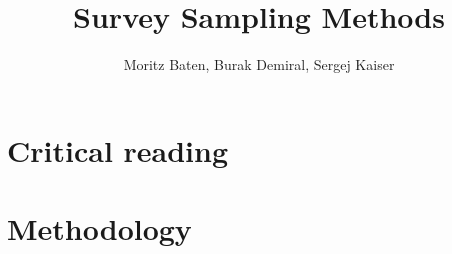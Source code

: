 \usepackage{amssymb}
\usepackage{graphicx}
\usepackage{lmodern}
\usepackage[left=2cm,right=2cm,top=2cm,bottom=2cm]{geometry}
\usepackage{float}
\usepackage{adjustbox}
\usepackage{booktabs}
\usepackage[left=3cm,right=3cm,top=3cm,bottom=3cm]{geometry}
\usepackage{fancyhdr} %
\usepackage{natbib}
 
\title{Survey Sampling Methods}
\author{Moritz Baten, Burak Demiral,  Sergej Kaiser}
 

	
 	\maketitle
 	
 	\section{Critical reading}
 
 	\section{Methodology}
 		
		
		\newpage
\renewcommand{\refname}{\section*{Bibliography}}



